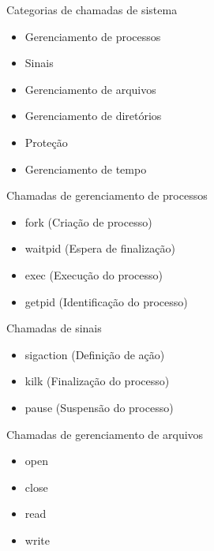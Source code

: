\documentclass[aspectratio=169,
				xcolor=table]{beamer}
\begin{document}
	\begin{frame}{Categorias de chamadas de sistema}
		\begin{itemize}
			\item Gerenciamento de processos	
			\vspace{0.8em}
			\item Sinais	
			\vspace{0.8em}
			\item Gerenciamento de arquivos	
			\vspace{0.8em}
			\item Gerenciamento de diretórios	
			\vspace{0.8em}
			\item Proteção	
			\vspace{0.8em}
			\item Gerenciamento de tempo
		\end{itemize}
	\end{frame}
	
	\begin{frame}{Chamadas de gerenciamento de processos}
		\begin{itemize}
			\item fork (Criação de processo)
			\item waitpid (Espera de finalização)
			\item exec (Execução do processo)
			\item getpid (Identificação do processo)
		\end{itemize}
		
	\end{frame}
			
	\begin{frame}{Chamadas de sinais}
		\begin{itemize}
			\item sigaction (Definição de ação)
			\item kilk (Finalização do processo)
			\item pause (Suspensão do processo)
		\end{itemize}
		
	\end{frame}
	
	\begin{frame}{Chamadas de gerenciamento de arquivos}
		\begin{itemize}
			\item open
			\item close
			\item read
			\item write
		\end{itemize}
		
	\end{frame}	
	
\end{document}
